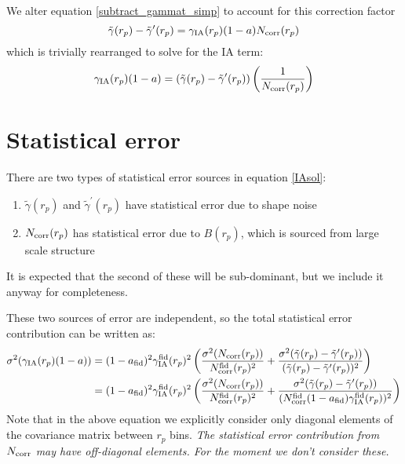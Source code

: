 \documentclass[onecolumn,amsmath,aps,fleqn, superscriptaddress]{revtex4}
\begin{document}
We alter equation \ref{subtract_gammat_simp} to account for this correction factor
\begin{equation}
\tilde{\gamma}(r_p) - \tilde{\gamma}^\prime(r_p) = \gamma_{\rm IA}(r_p)(1-a) N_{\rm corr}(r_p)
\label{subtract_gammat_fac}
\end{equation}
which is trivially rearranged to solve for the IA term:
\begin{equation}
\gamma_{\rm IA}(r_p)(1-a) = \left(\tilde{\gamma}(r_p) - \tilde{\gamma}^\prime(r_p)\right)\left(\frac{1}{N_{\rm corr}(r_p)}\right)
\label{IAsol}
\end{equation}

\section*{Statistical error}

There are two types of statistical error sources in equation \ref{IAsol}: 
\begin{enumerate}
\item{$\tilde{\gamma}(r_p)$ and $\tilde{\gamma}^\prime(r_p)$ have statistical error due to shape noise}
\item{$N_{\rm corr}(r_p)$ has statistical error due to $B(r_p)$, which is sourced from large scale structure}
\end{enumerate}
It is expected that the second of these will be sub-dominant, but we include it anyway for completeness. 

These two sources of error are independent, so the total statistical error contribution can be written as:
\begin{align}
\sigma^2(\gamma_{\rm IA}(r_p)(1-a)) &= (1-a_{\rm fid})^2\gamma_{\rm IA}^{\rm fid}(r_p)^2\left(\frac{\sigma^2(N_{\rm corr}(r_p))}{N_{\rm corr}^{\rm fid}(r_p)^2} + \frac{\sigma^2(\tilde{\gamma}(r_p) - \tilde{\gamma}^\prime(r_p))}{(\tilde{\gamma}(r_p) - \tilde{\gamma}^\prime(r_p))^2}\right) \nonumber \\
&= (1-a_{\rm fid})^2\gamma_{\rm IA}^{\rm fid}(r_p)^2\left(\frac{\sigma^2(N_{\rm corr}(r_p))}{N_{\rm corr}^{\rm fid}(r_p)^2} + \frac{\sigma^2(\tilde{\gamma}(r_p) - \tilde{\gamma}^\prime(r_p))}{(N_{\rm corr}^{\rm fid}(1-a_{\rm fid})\gamma_{\rm IA}^{\rm fid}(r_p))^2}\right)
\label{error}
\end{align}
Note that in the above equation we explicitly consider only diagonal elements of the covariance matrix between $r_p$ bins. {\it The statistical error contribution from $N_{\rm corr}$ may have off-diagonal elements. For the moment we don't consider these.}
\end{document}
